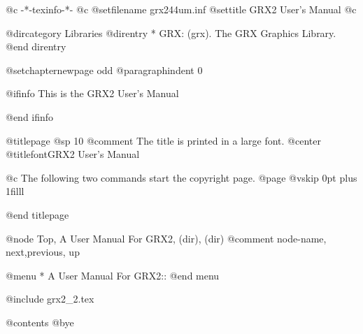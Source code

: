    @c -*-texinfo-*-
@c %
@setfilename grx244um.inf
@settitle GRX2 User's Manual
@c %

@dircategory Libraries
@direntry
* GRX: (grx).                   The GRX Graphics Library.
@end direntry

@setchapternewpage odd
@paragraphindent 0

@ifinfo
This is the GRX2 User's Manual

@end ifinfo

@titlepage
@sp 10
@comment The title is printed in a large font.
@center @titlefont{GRX2 User's Manual}

@c The following two commands start the copyright page.
@page
@vskip 0pt plus 1filll

@end titlepage


@node  Top, A User Manual For GRX2, (dir), (dir)
@comment node-name, next,previous, up

@menu
* A User Manual For GRX2::
@end menu

@include grx2_2.tex

@contents
@bye

